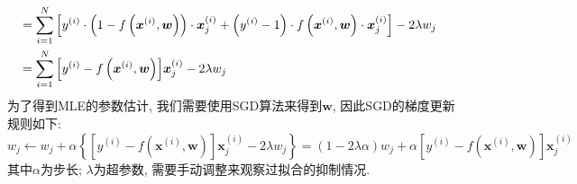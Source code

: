 \documentclass{article}
\begin{document}
\begin{homeworkProblem}
\begin{align}
		\\
		&=\sum_{i=1}^N{\left[ y^{\left( i \right)}\cdot \left( 1-f\left( \boldsymbol{x}^{\left( i \right)},\boldsymbol{w} \right) \right) \cdot \boldsymbol{x}_{j}^{\left( i \right)}+\left( y^{\left( i \right)}-1 \right) \cdot f\left( \boldsymbol{x}^{\left( i \right)},\boldsymbol{w} \right) \cdot \boldsymbol{x}_{j}^{\left( i \right)} \right]}-2\lambda w_j \notag
		\\
		&=\sum_{i=1}^N{\left[ y^{\left( i \right)}-f\left( \boldsymbol{x}^{\left( i \right)},\boldsymbol{w} \right) \right]}\boldsymbol{x}_{j}^{\left( i \right)}-2\lambda w_j \notag
	\end{align}
	为了得到MLE的参数估计, 我们需要使用SGD算法来得到$\boldsymbol{w}$, 因此SGD的梯度更新规则如下:
	$$w_j\gets w_j+\alpha \left\{ \left[ y^{\left( i \right)}-f\left( \boldsymbol{x}^{\left( i \right)},\boldsymbol{w} \right) \right] \boldsymbol{x}_{j}^{\left( i \right)}-2\lambda w_j \right\} =\left( 1-2\lambda \alpha \right) w_j+\alpha \left[ y^{\left( i \right)}-f\left( \boldsymbol{x}^{\left( i \right)},\boldsymbol{w} \right) \right] \boldsymbol{x}_{j}^{\left( i \right)}
	$$
	其中$\alpha$为步长; $\lambda$为超参数, 需要手动调整来观察过拟合的抑制情况.
\end{homeworkProblem}


%
\end{document}
